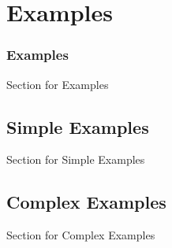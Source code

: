 \documentclass{beamer}
\begin{document}
\section{Examples}
\begin{frame}
\frametitle{Examples}
Section for Examples
\end{frame}

\subsection{Simple Examples}
\begin{frame}
Section for Simple Examples
\end{frame}

\subsection{Complex Examples}
\begin{frame}
Section for Complex Examples
\end{frame}
\end{document}
